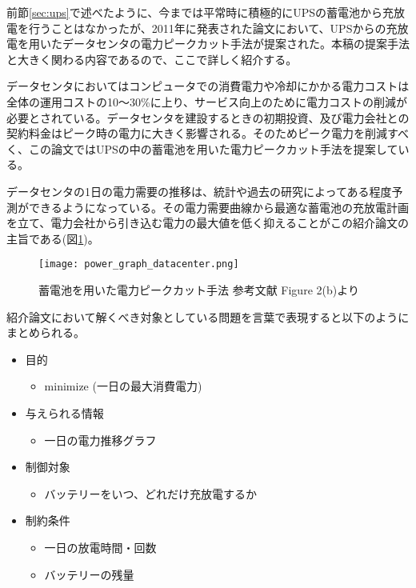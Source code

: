 前節\ref{sec:ups}で述べたように、今までは平常時に積極的にUPSの蓄電池から充放電を行うことはなかったが、2011年に発表された論文\cite{Govindan:2011:BLT:2024723.2000105}において、UPSからの充放電を用いたデータセンタの電力ピークカット手法が提案された。本稿の提案手法と大きく関わる内容であるので、ここで詳しく紹介する。

データセンタにおいてはコンピュータでの消費電力や冷却にかかる電力コストは全体の運用コストの10〜30\%に上り、サービス向上のために電力コストの削減が必要とされている。データセンタを建設するときの初期投資、及び電力会社との契約料金はピーク時の電力に大きく影響される。そのためピーク電力を削減すべく、この論文ではUPSの中の蓄電池を用いた電力ピークカット手法を提案している。

データセンタの1日の電力需要の推移は、統計や過去の研究によってある程度予測ができるようになっている。その電力需要曲線から最適な蓄電池の充放電計画を立て、電力会社から引き込む電力の最大値を低く抑えることがこの紹介論文の主旨である(図\ref{fig:power_graph_datacenter})。
\begin{figure}[t]
 \begin{center}
  \texttt{[image: power\_graph\_datacenter.png]}
 \end{center}
 \caption{蓄電池を用いた電力ピークカット手法 参考文献\cite{Govindan:2011:BLT:2024723.2000105} Figure 2(b)より}
 \label{fig:power_graph_datacenter}
\end{figure}

紹介論文において解くべき対象としている問題を言葉で表現すると以下のようにまとめられる。

\begin{itemize}
  \item 目的
    \begin{itemize}
      \item minimize (一日の最大消費電力)
    \end{itemize}
  \item 与えられる情報
    \begin{itemize}
      \item 一日の電力推移グラフ
    \end{itemize}
  \item 制御対象
    \begin{itemize}
      \item バッテリーをいつ、どれだけ充放電するか
    \end{itemize}
  \item 制約条件
    \begin{itemize}
      \item 一日の放電時間・回数
      \item バッテリーの残量
    \end{itemize}
\end{itemize}

